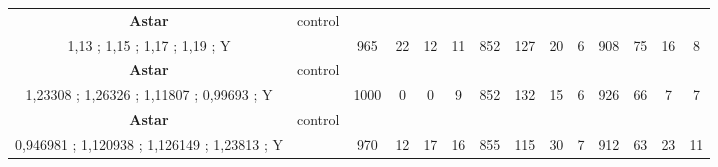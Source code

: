 \begin{table}[]
{\begin{tabular}{|c|c|c|c|c|c|c|c|c|c|c|c|c|c|}
\cellcolor{blue!15}\textbf{Astar} & control& {\color[HTML]{00009B} } & {\color[HTML]{9A0000} } & {\color[HTML]{009901} } &  & {\color[HTML]{00009B} } & {\color[HTML]{9A0000} } & {\color[HTML]{009901} } &  & {\color[HTML]{00009B} } & {\color[HTML]{9A0000} } & {\color[HTML]{009901} } &  \\ 
\cellcolor{ blue!15}1,13 ; 1,15 ; 1,17 ; 1,19 ; Y &  & \multirow{-2}{*}{{\color[HTML]{00009B} 965}} & \multirow{-2}{*}{{\color[HTML]{9A0000} 22}} & \multirow{-2}{*}{{\color[HTML]{009901} 12}} & \multirow{-2}{*}{11} & \multirow{-2}{*}{{\color[HTML]{00009B} 852}} & \multirow{-2}{*}{{\color[HTML]{9A0000} 127}} & \multirow{-2}{*}{{\color[HTML]{009901} 20}} & \multirow{-2}{*}{6} & \multirow{-2}{*}{{\color[HTML]{00009B} 908}} & \multirow{-2}{*}{{\color[HTML]{9A0000} 75}} & \multirow{-2}{*}{{\color[HTML]{009901} 16}} & \multirow{-2}{*}{8} \\ \hline

\cellcolor{blue!15}\textbf{Astar} & control& {\color[HTML]{00009B} } & {\color[HTML]{9A0000} } & {\color[HTML]{009901} } &  & {\color[HTML]{00009B} } & {\color[HTML]{9A0000} } & {\color[HTML]{009901} } &  & {\color[HTML]{00009B} } & {\color[HTML]{9A0000} } & {\color[HTML]{009901} } &  \\ 
\cellcolor{ blue!15}1,23308 ; 1,26326 ; 1,11807 ; 0,99693 ; Y &  & \multirow{-2}{*}{{\color[HTML]{00009B} 1000}} & \multirow{-2}{*}{{\color[HTML]{9A0000} 0}} & \multirow{-2}{*}{{\color[HTML]{009901} 0}} & \multirow{-2}{*}{9} & \multirow{-2}{*}{{\color[HTML]{00009B} 852}} & \multirow{-2}{*}{{\color[HTML]{9A0000} 132}} & \multirow{-2}{*}{{\color[HTML]{009901} 15}} & \multirow{-2}{*}{6} & \multirow{-2}{*}{{\color[HTML]{00009B} 926}} & \multirow{-2}{*}{{\color[HTML]{9A0000} 66}} & \multirow{-2}{*}{{\color[HTML]{009901} 7}} & \multirow{-2}{*}{7} \\ \hline

\cellcolor{blue!15}\textbf{Astar} & control& {\color[HTML]{00009B} } & {\color[HTML]{9A0000} } & {\color[HTML]{009901} } &  & {\color[HTML]{00009B} } & {\color[HTML]{9A0000} } & {\color[HTML]{009901} } &  & {\color[HTML]{00009B} } & {\color[HTML]{9A0000} } & {\color[HTML]{009901} } &  \\ 
\cellcolor{ blue!15}0,946981 ; 1,120938 ; 1,126149 ; 1,23813 ; Y &  & \multirow{-2}{*}{{\color[HTML]{00009B} 970}} & \multirow{-2}{*}{{\color[HTML]{9A0000} 12}} & \multirow{-2}{*}{{\color[HTML]{009901} 17}} & \multirow{-2}{*}{16} & \multirow{-2}{*}{{\color[HTML]{00009B} 855}} & \multirow{-2}{*}{{\color[HTML]{9A0000} 115}} & \multirow{-2}{*}{{\color[HTML]{009901} 30}} & \multirow{-2}{*}{7} & \multirow{-2}{*}{{\color[HTML]{00009B} 912}} & \multirow{-2}{*}{{\color[HTML]{9A0000} 63}} & \multirow{-2}{*}{{\color[HTML]{009901} 23}} & \multirow{-2}{*}{11} \\ \hline


\end{tabular}}
\end{table}
